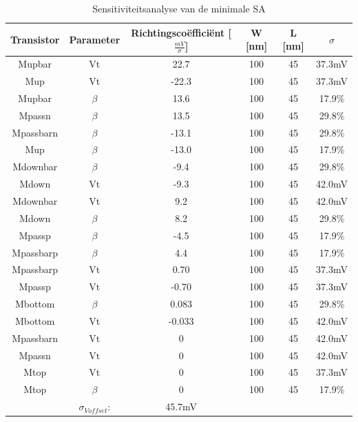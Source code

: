 \begin{table}
\begin{tabular}{cccccc}
\hline 
Transistor & Parameter & Richtingscoëfficiënt [$\frac{mV}{\sigma}$] & W [nm] & L [nm] & $\sigma$ \\ 
\hline 
Mupbar & Vt & 22.7 & 100 & 45 & 37.3mV \\ 
Mup & Vt & -22.3 & 100 & 45 & 37.3mV \\ 
Mupbar & $\beta$ & 13.6 & 100 & 45 & 17.9\% \\ 
Mpassn & $\beta$ & 13.5 & 100 & 45 & 29.8\% \\ 
Mpassbarn & $\beta$ & -13.1 & 100 & 45 & 29.8\% \\ 
Mup & $\beta$ & -13.0 & 100 & 45 & 17.9\% \\ 
Mdownbar & $\beta$ & -9.4 & 100 & 45 & 29.8\% \\ 
Mdown & Vt & -9.3 & 100 & 45 & 42.0mV \\ 
Mdownbar & Vt & 9.2 & 100 & 45 & 42.0mV \\ 
Mdown & $\beta$ & 8.2 & 100 & 45 & 29.8\% \\ 
Mpassp & $\beta$ & -4.5 & 100 & 45 & 17.9\% \\ 
Mpassbarp & $\beta$ & 4.4 & 100 & 45 & 17.9\% \\ 
Mpassbarp & Vt & 0.70 & 100 & 45 & 37.3mV \\ 
Mpassp & Vt & -0.70 & 100 & 45 & 37.3mV \\ 
Mbottom & $\beta$ & 0.083 & 100 & 45 & 29.8\% \\ 
Mbottom & Vt & -0.033 & 100 & 45 & 42.0mV \\ 
Mpassbarn & Vt & 0 & 100 & 45 & 42.0mV \\
Mpassn & Vt & 0 & 100 & 45 & 42.0mV \\
Mtop & Vt & 0 & 100 & 45 & 37.3mV \\
Mtop & $\beta$ & 0 & 100 & 45 & 17.9\% \\
\hline 
\hline & $\sigma_{Voffset}$: & 45.7mV & & & \\
\hline
\end{tabular} 
\caption[Sensitiviteitsanalyse van de minimale SA]{Sensitiviteitsanalyse van de minimale SA}
\label{tab:min-sensanalysis}
\end{table}

